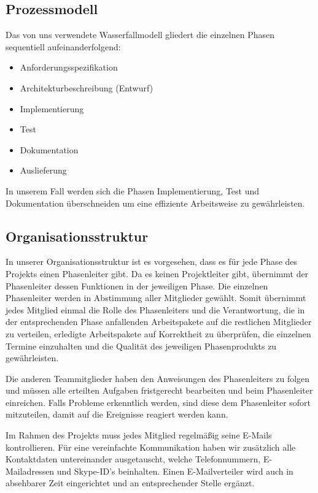 \documentclass[fontsize=12pt,paper=a4,twoside]{scrartcl}
\begin{document}
\subsection{Prozessmodell}
\label{sec:prozessmodell}

Das von uns verwendete Wasserfallmodell gliedert die einzelnen Phasen sequentiell aufeinanderfolgend:\\
\begin{itemize}

\item Anforderungsspezifikation
\item Architekturbeschreibung (Entwurf)
\item Implementierung
\item Test
\item Dokumentation
\item Auslieferung
\end{itemize}

In unserem Fall werden sich die Phasen Implementierung, Test und Dokumentation überschneiden um eine effiziente Arbeitsweise zu gewährleisten.

\subsection{Organisationsstruktur}
\label{sec:Orga}
In unserer Organisationsstruktur ist es vorgesehen, dass es für jede Phase des Projekts einen Phasenleiter gibt. Da es keinen Projektleiter gibt, übernimmt der Phasenleiter dessen Funktionen in der jeweiligen Phase. Die einzelnen Phasenleiter werden in Abstimmung aller Mitglieder gewählt. Somit übernimmt jedes Mitglied einmal die Rolle des Phasenleiters und die Verantwortung, die in der entsprechenden Phase anfallenden Arbeitspakete auf die restlichen Mitglieder zu verteilen, erledigte Arbeitspakete auf Korrektheit zu überprüfen, die einzelnen Termine einzuhalten und die Qualität des jeweiligen Phasenprodukts zu gewährleisten.

Die anderen Teammitglieder haben den Anweisungen des Phasenleiters zu folgen und müssen alle erteilten Aufgaben fristgerecht bearbeiten und beim Phasenleiter einreichen. Falls Probleme erkenntlich werden, sind diese dem Phasenleiter sofort mitzuteilen, damit auf die Ereignisse reagiert werden kann.

Im Rahmen des Projekts muss jedes Mitglied regelmäßig seine E-Mails kontrollieren. Für eine vereinfachte Kommunikation haben wir zusätzlich alle Kontaktdaten untereinander ausgetauscht, welche Telefonnummern, E-Mailadressen und Skype-ID's beinhalten. Einen E-Mailverteiler wird auch in absehbarer Zeit eingerichtet und an entsprechender Stelle ergänzt.
\end{document}
